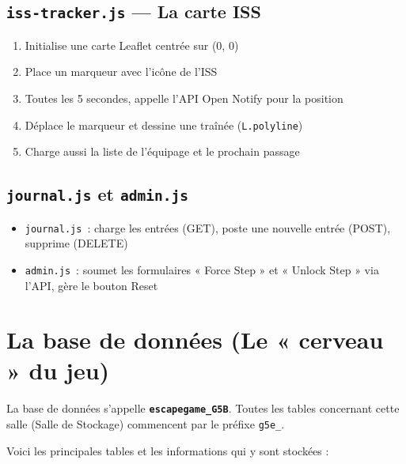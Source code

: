 \documentclass[12pt,a4paper]{article}
\begin{document}
\subsection{\texttt{iss-tracker.js} --- La carte ISS}

\begin{enumerate}
    \item Initialise une carte Leaflet centrée sur (0, 0)
    \item Place un marqueur avec l'icône de l'ISS
    \item Toutes les 5 secondes, appelle l'API Open Notify pour la position
    \item Déplace le marqueur et dessine une traînée (\texttt{L.polyline})
    \item Charge aussi la liste de l'équipage et le prochain passage
\end{enumerate}

\subsection{\texttt{journal.js} et \texttt{admin.js}}

\begin{itemize}
    \item \texttt{journal.js}~: charge les entrées (GET), poste une nouvelle entrée (POST), supprime (DELETE)
    \item \texttt{admin.js}~: soumet les formulaires « Force Step » et « Unlock Step » via l'API, gère le bouton Reset
\end{itemize}

\section{La base de données (Le « cerveau » du jeu)}

La base de données s'appelle \textbf{\texttt{escapegame\_G5B}}. Toutes les tables concernant cette salle (Salle de Stockage) commencent par le préfixe \texttt{g5e\_}.

Voici les principales tables et les informations qui y sont stockées :
\end{document}
